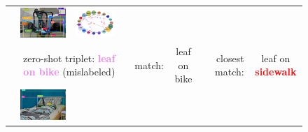 \begin{figure}
\begin{tabular}{p{0.3cm}|rc|p{0.1cm}rc|p{0.1cm}rc}
		& \includegraphics[width=\figwidthvis, align=c]{2412160_baseline_zs_ours.png} & 
		\includegraphics[width=\figwidthvis, align=c]{2412160_baseline_zs_graph_ours.png} \Tstrutmore\Bstrut\\
		& \multicolumn{2}{r|}{zero-shot triplet: \textcolor{violet}{\textbf{leaf on bike}} (mislabeled)} & & match: & leaf on bike & & closest match: & {leaf on \textcolor{red}{\textbf{sidewalk}}} \Bstrut\\
		\cline{2-9} 
		& \includegraphics[width=\figwidthvis, align=c]{2326876_baseline_zs.png} &

\end{tabular}
\end{figure}
